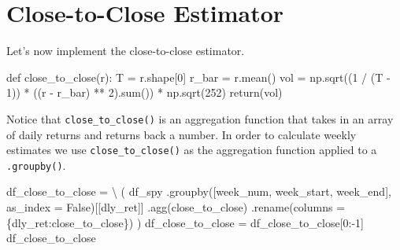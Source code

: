 \documentclass[
  letterpaper,
  DIV=11,
  numbers=noendperiod]{scrreprt}
\newenvironment{Shaded}{\begin{snugshade}}{\end{snugshade}}
\newcommand{\BuiltInTok}[1]{\textcolor[rgb]{0.00,0.23,0.31}{#1}}
\newcommand{\ControlFlowTok}[1]{\textcolor[rgb]{0.00,0.23,0.31}{#1}}
\newcommand{\DecValTok}[1]{\textcolor[rgb]{0.68,0.00,0.00}{#1}}
\newcommand{\KeywordTok}[1]{\textcolor[rgb]{0.00,0.23,0.31}{#1}}
\newcommand{\NormalTok}[1]{\textcolor[rgb]{0.00,0.23,0.31}{#1}}
\newcommand{\OperatorTok}[1]{\textcolor[rgb]{0.37,0.37,0.37}{#1}}
\newcommand{\StringTok}[1]{\textcolor[rgb]{0.13,0.47,0.30}{#1}}
\newcommand{\VariableTok}[1]{\textcolor[rgb]{0.07,0.07,0.07}{#1}}
\begin{document}
\hypertarget{close-to-close-estimator}{%
\section{Close-to-Close Estimator}\label{close-to-close-estimator}}

Let's now implement the close-to-close estimator.

\begin{Shaded}
\begin{Highlighting}[]
\KeywordTok{def}\NormalTok{ close\_to\_close(r):}
\NormalTok{    T }\OperatorTok{=}\NormalTok{ r.shape[}\DecValTok{0}\NormalTok{]}
\NormalTok{    r\_bar }\OperatorTok{=}\NormalTok{ r.mean()}
\NormalTok{    vol }\OperatorTok{=}\NormalTok{ np.sqrt((}\DecValTok{1} \OperatorTok{/}\NormalTok{ (T }\OperatorTok{{-}} \DecValTok{1}\NormalTok{)) }\OperatorTok{*}\NormalTok{ ((r }\OperatorTok{{-}}\NormalTok{ r\_bar) }\OperatorTok{**} \DecValTok{2}\NormalTok{).}\BuiltInTok{sum}\NormalTok{()) }\OperatorTok{*}\NormalTok{ np.sqrt(}\DecValTok{252}\NormalTok{)}
    \ControlFlowTok{return}\NormalTok{(vol)}
\end{Highlighting}
\end{Shaded}

Notice that \texttt{close\_to\_close()} is an aggregation function that
takes in an array of daily returns and returns back a number. In order
to calculate weekly estimates we use \texttt{close\_to\_close()} as the
aggregation function applied to a \texttt{.groupby()}.

\begin{Shaded}
\begin{Highlighting}[]
\NormalTok{df\_close\_to\_close }\OperatorTok{=} \OperatorTok{\textbackslash{}}
\NormalTok{    (}
\NormalTok{    df\_spy}
\NormalTok{        .groupby([}\StringTok{\textquotesingle{}week\_num\textquotesingle{}}\NormalTok{, }\StringTok{\textquotesingle{}week\_start\textquotesingle{}}\NormalTok{, }\StringTok{\textquotesingle{}week\_end\textquotesingle{}}\NormalTok{], as\_index }\OperatorTok{=} \VariableTok{False}\NormalTok{)[[}\StringTok{\textquotesingle{}dly\_ret\textquotesingle{}}\NormalTok{]]}
\NormalTok{        .agg(close\_to\_close)}
\NormalTok{        .rename(columns }\OperatorTok{=}\NormalTok{ \{}\StringTok{\textquotesingle{}dly\_ret\textquotesingle{}}\NormalTok{:}\StringTok{\textquotesingle{}close\_to\_close\textquotesingle{}}\NormalTok{\})}
\NormalTok{    )}
\NormalTok{df\_close\_to\_close }\OperatorTok{=}\NormalTok{ df\_close\_to\_close[}\DecValTok{0}\NormalTok{:}\OperatorTok{{-}}\DecValTok{1}\NormalTok{]}
\NormalTok{df\_close\_to\_close}
\end{Highlighting}
\end{Shaded}
\end{document}
